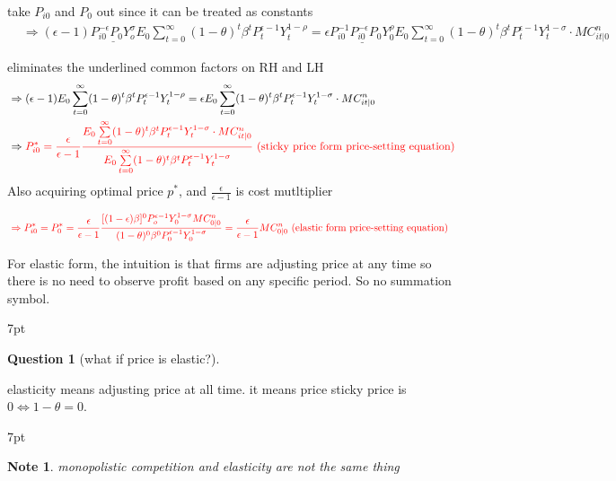 \documentclass{article}
\newenvironment{blueblock}{
\def\FrameCommand{
  \hspace{1pt}
    {\color{DarkBlue}
    \vrule width 2pt}
    {\color{blueshade}
    \vrule width 4pt}
  \colorbox{blueshade}
}
\MakeFramed{
  \advance
  \hsize-
  \width
  \FrameRestore}
\noindent\hspace{-4.55pt}%
\begin{adjustwidth}{}{7pt}
\vspace{2pt}\vspace{2pt}
}
{\vspace{2pt}\end{adjustwidth}\endMakeFramed}
\newenvironment{redblock}{
\def\FrameCommand{
  \hspace{1pt}
    {\color{LightCoral}
    \vrule width 2pt}
    {\color{redshade}
    \vrule width 4pt}
  \colorbox{redshade}
}
\MakeFramed{
  \advance
  \hsize-
  \width
  \FrameRestore}
\noindent\hspace{-4.55pt}%
\begin{adjustwidth}{}{7pt}
\vspace{2pt}\vspace{2pt}
}
{\vspace{2pt}\end{adjustwidth}\endMakeFramed}
\newtheorem{question}{Question}
\newtheorem{note}{Note}
\begin{document}
take $P_{i0}$ and $P_0$ out since it can be treated as constants
\begin{align}
& \Rightarrow (\epsilon-1)\underline{P_{i0}^{-\epsilon}P_{0}Y_{o}^{\sigma}}E_{0}\sum\limits_{t=0}^{\infty}(1-\theta)^{t} \beta^{t} P_{t}^{\epsilon-1}Y_{t}^{1-\rho}=\epsilon \underline{P_{i0}^{-1} P_{i0}^{-\epsilon} P_{0} Y_{0}^{\rho}} E_{0}\sum\limits_{t=0}^{\infty}(1-\theta)^{t} \beta^{t} P_{t}^{\epsilon-1} Y_{t}^{1-\sigma} \cdot MC_{it|0}^{n}
\end{align}

eliminates the underlined common factors on RH and LH
\begin{align}
& \Rightarrow (\epsilon-1)E_{0}\sum\limits_{t=0}^{\infty}(1-\theta)^{t} \beta^{t} P_{t}^{\epsilon-1}Y_{t}^{1-\rho}=\epsilon E_{0}\sum\limits_{t=0}^{\infty}(1-\theta)^{t} \beta^{t} P_{t}^{\epsilon-1} Y_{t}^{1-\sigma} \cdot MC_{it|0}^{n}
\\& \Rightarrow \color{red} P_{i0}^{*}=\frac{\epsilon}{\epsilon-1} \frac{E_{0}\sum\limits_{t=0}^{\infty}(1-\theta)^{t} \beta^{t} P_{t}^{\epsilon-1} Y_{t}^{1-\sigma} \cdot MC_{it|0}^{n}}{E_{0}\sum\limits_{t=0}^{\infty}(1-\theta)^{t} \beta^{t} P_{t}^{\epsilon-1}Y_{t}^{1-\sigma}}
\text{ (sticky price form price-setting equation) }
\end{align}
Also acquiring optimal price $p^*$, and $\frac{\epsilon}{\epsilon-1}$ is cost mutltiplier

\begin{align}
&\color{red} \Rightarrow P_{i0}^{*}=P_{0}^{*}=\frac{\epsilon}{\epsilon-1}\frac{
[(1-\epsilon)\beta]^{0}P_{o}^{\epsilon-1}Y_{0}^{1-\sigma} MC_{0|0}^{n}
}{
(1-\theta)^{0} \beta^{0} P_{0}^{\epsilon-1}Y_{0}^{1-\sigma}
}=\frac{\epsilon}{\epsilon-1} MC^{n}_{0|0}
\text{ (elastic form price-setting equation)}
\end{align}

For elastic form, the intuition is that firms are adjusting price at any time so there is no need to observe profit based on any specific period. So no summation symbol.


\begin{redblock}
\begin{question}[what if price is elastic?]
\end{question}
elasticity means adjusting price at all time. it means price sticky price is $0 \Leftrightarrow 1- \theta =0 $.
\end{redblock}

\begin{blueblock}
\begin{note}
monopolistic competition and elasticity are not the same thing
\end{note}
\end{blueblock}
\end{document}
